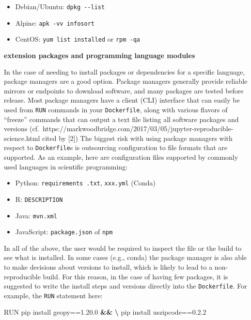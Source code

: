 \documentclass[10pt,letterpaper]{article}
\newenvironment{Shaded}{\begin{snugshade}}{\end{snugshade}}
\newcommand{\ExtensionTok}[1]{#1}
\newcommand{\KeywordTok}[1]{\textcolor[rgb]{0.13,0.29,0.53}{\textbf{#1}}}
\newcommand{\NormalTok}[1]{#1}
\providecommand{\tightlist}{%
  \setlength{\itemsep}{0pt}\setlength{\parskip}{0pt}}
\begin{document}
\begin{itemize}
\tightlist
\item
  Debian/Ubuntu: \texttt{dpkg\ -\/-list}
\item
  Alpine: \texttt{apk\ -vv\ info\textbar{}sort}
\item
  CentOS: \texttt{yum\ list\ installed} or \texttt{rpm\ -qa}
\end{itemize}

\textbf{extension packages and programming language modules}

In the case of needing to install packages or dependencies for a
specific language, package managers are a good option. Package managers
generally provide reliable mirrors or endpoints to download software,
and many packages are tested before release. Most package managers have
a client (CLI) interface that can easily be used from \texttt{RUN}
commands in your \texttt{Dockerfile}, along with various flavors of
``freeze'' commands that can output a text file listing all software
packages and versions
(cf.~https://markwoodbridge.com/2017/03/05/jupyter-reproducible-science.html
cited by {[}2{]}) The biggest risk with using package managers with
respect to \texttt{Dockerfile}s is outsourcing configuration to file
formats that are supported. As an example, here are configuration files
supported by commonly used languages in scientific programming:

\begin{itemize}
\tightlist
\item
  Python: \texttt{requirements\ .txt}, \texttt{xxx.yml} (Conda)
\item
  R: \texttt{DESCRIPTION}
\item
  Java: \texttt{mvn.xml}
\item
  JavaScript: \texttt{package.json} of \texttt{npm}
\end{itemize}

In all of the above, the user would be required to inspect the file or
the build to see what is installed. In some cases (e.g., conda) the
package manager is also able to make decisions about versions to
install, which is likely to lead to a non-reproducible build. For this
reason, in the case of having few packages, it is suggested to write the
install steps and versions directly into the \texttt{Dockerfile}. For
example, the \texttt{RUN} statement here:

\begin{Shaded}
\begin{Highlighting}[]
\ExtensionTok{RUN}\NormalTok{ pip install geopy==1.20.0 }\KeywordTok{&&} \KeywordTok{\textbackslash{}}
    \ExtensionTok{pip}\NormalTok{ install uszipcode==0.2.2}
\end{Highlighting}
\end{Shaded}
\end{document}
